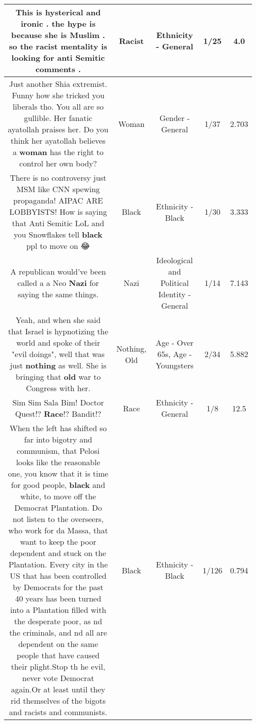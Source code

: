 \documentclass[11pt]{article}
\newlength\mylength
\begin{document}
\begin{center}
\begin{longtable}{|C{.65\mylength}|C{.30\mylength}|C{.12\mylength}|C{.12\mylength}|C{.12\mylength}|}
  \small This is hysterical and ironic . the hype is because she is Muslim . so the \textbf{racist} mentality is looking for anti Semitic comments .\normalsize   & Racist & Ethnicity - General & 1/25 & 4.0 \\  \hline
  \small Just another Shia extremist. Funny how she tricked you liberals tho. You all are so gullible. Her fanatic ayatollah praises her. Do you think her ayatollah believes a \textbf{woman} has the right to control her own body?\normalsize   & Woman & Gender - General & 1/37 & 2.703 \\  \hline
  \small There is no controversy just MSM like CNN spewing propaganda! AIPAC ARE LOBBYISTS! How is saying that Anti Semitic LoL and you Snowflakes tell \textbf{black} ppl to move on 😂\normalsize   & Black & Ethnicity - Black & 1/30 & 3.333 \\  \hline
  \small A republican would've been called a a Neo \textbf{Nazi} for saying the same things.\normalsize   & Nazi &  Ideological and Political Identity - General & 1/14 & 7.143 \\  \hline
  \small Yeah, and when she said that Israel is hypnotizing the world and spoke of their "evil doings", well that was just \textbf{nothing} as well. She is bringing that \textbf{old} war to Congress with her.\normalsize   & Nothing, Old & Age - Over 65s, Age - Youngsters & 2/34 & 5.882 \\  \hline
  \small Sim Sim Sala Bim! Doctor Quest!?  \textbf{Race}!? Bandit!?\normalsize   & Race & Ethnicity - General & 1/8 & 12.5 \\  \hline
  \small When the left has shifted so far into bigotry and communism,  that Pelosi looks like the reasonable one, you know that it is time for good people, \textbf{black} and white, to move off the Democrat Plantation. Do not listen to the overseers,  who work for da Massa, that want to keep the poor dependent and stuck on the Plantation.  Every city in the US that has been controlled by Democrats for the past 40 years has been turned into a Plantation filled with the desperate poor, as nd the criminals, and nd all are dependent on the same people that have caused their plight.Stop th he evil, never vote Democrat again.Or at least until they rid themselves of the bigots and racists and communists.\normalsize   & Black & Ethnicity - Black & 1/126 & 0.794 \\  \hline

\end{longtable}
\end{center}
\end{document}

